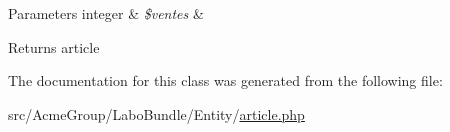 \begin{DoxyParams}[1]{Parameters}
integer & {\em \$ventes} & \\
\hline
\end{DoxyParams}
\begin{DoxyReturn}{Returns}
article 
\end{DoxyReturn}


The documentation for this class was generated from the following file\+:\begin{DoxyCompactItemize}
\item 
src/\+Acme\+Group/\+Labo\+Bundle/\+Entity/\hyperlink{_labo_bundle_2_entity_2article_8php}{article.\+php}\end{DoxyCompactItemize}
